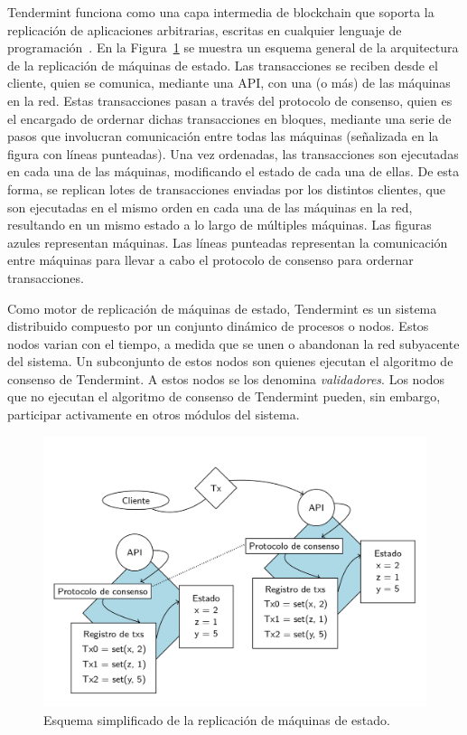 Tendermint funciona como una capa intermedia de blockchain que soporta la replicación de aplicaciones arbitrarias,
escritas en cualquier lenguaje de programación~\cite{tendermint.design}.
%
En la Figura~\ref{fig:replication} se muestra un esquema general de la arquitectura de la replicación de máquinas de
estado.
%
Las transacciones se reciben desde el cliente, quien se comunica, mediante una API, con una (o más) de las máquinas
en la red.
%
Estas transacciones pasan a través del protocolo de consenso, quien es el encargado de ordernar dichas
transacciones en bloques, mediante una serie de pasos que involucran comunicación entre todas las máquinas
(señalizada en la figura con líneas punteadas).
%
Una vez ordenadas, las transacciones son ejecutadas en cada una de las máquinas, modificando el estado
de cada una de ellas.
%
De esta forma, se replican lotes de transacciones enviadas por los distintos clientes, que son ejecutadas en el mismo
orden en cada una de las máquinas en la red, resultando en un mismo estado a lo largo de múltiples máquinas.
%
Las figuras azules representan máquinas.
%
Las líneas punteadas representan la comunicación entre máquinas para llevar a cabo el protocolo de consenso para ordernar
transacciones.

Como motor de replicación de máquinas de estado, Tendermint es un sistema distribuido compuesto por un conjunto
dinámico de procesos o nodos.
%
Estos nodos varian con el tiempo, a medida que se unen o abandonan la red subyacente del sistema.
%
Un subconjunto de estos nodos son quienes ejecutan el algoritmo de consenso de Tendermint.
%
A estos nodos se los denomina \textit{validadores}.
%
Los nodos que no ejecutan el algoritmo de consenso de Tendermint pueden, sin embargo, participar
activamente en otros módulos del sistema.


\begin{figure}
  \centering
  \includegraphics[scale=0.3]{figures/state-machine-replication.png}
  \caption{Esquema simplificado de la replicación de máquinas de estado.}
  \label{fig:replication}
\end{figure}

